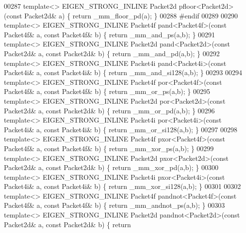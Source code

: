 \begin{DoxyCode}
00287 \textcolor{keyword}{template}<> EIGEN\_STRONG\_INLINE Packet2d pfloor<Packet2d>(\textcolor{keyword}{const} Packet2d& a) \{ \textcolor{keywordflow}{return} \_mm\_floor\_pd(a); \}
00288 \textcolor{preprocessor}{#endif}
00289 
00290 \textcolor{keyword}{template}<> EIGEN\_STRONG\_INLINE Packet4f pand<Packet4f>(\textcolor{keyword}{const} Packet4f& a, \textcolor{keyword}{const} Packet4f& b) \{ \textcolor{keywordflow}{return} 
      \_mm\_and\_ps(a,b); \}
00291 \textcolor{keyword}{template}<> EIGEN\_STRONG\_INLINE Packet2d pand<Packet2d>(\textcolor{keyword}{const} Packet2d& a, \textcolor{keyword}{const} Packet2d& b) \{ \textcolor{keywordflow}{return} 
      \_mm\_and\_pd(a,b); \}
00292 \textcolor{keyword}{template}<> EIGEN\_STRONG\_INLINE Packet4i pand<Packet4i>(\textcolor{keyword}{const} Packet4i& a, \textcolor{keyword}{const} Packet4i& b) \{ \textcolor{keywordflow}{return} 
      \_mm\_and\_si128(a,b); \}
00293 
00294 \textcolor{keyword}{template}<> EIGEN\_STRONG\_INLINE Packet4f por<Packet4f>(\textcolor{keyword}{const} Packet4f& a, \textcolor{keyword}{const} Packet4f& b) \{ \textcolor{keywordflow}{return} 
      \_mm\_or\_ps(a,b); \}
00295 \textcolor{keyword}{template}<> EIGEN\_STRONG\_INLINE Packet2d por<Packet2d>(\textcolor{keyword}{const} Packet2d& a, \textcolor{keyword}{const} Packet2d& b) \{ \textcolor{keywordflow}{return} 
      \_mm\_or\_pd(a,b); \}
00296 \textcolor{keyword}{template}<> EIGEN\_STRONG\_INLINE Packet4i por<Packet4i>(\textcolor{keyword}{const} Packet4i& a, \textcolor{keyword}{const} Packet4i& b) \{ \textcolor{keywordflow}{return} 
      \_mm\_or\_si128(a,b); \}
00297 
00298 \textcolor{keyword}{template}<> EIGEN\_STRONG\_INLINE Packet4f pxor<Packet4f>(\textcolor{keyword}{const} Packet4f& a, \textcolor{keyword}{const} Packet4f& b) \{ \textcolor{keywordflow}{return} 
      \_mm\_xor\_ps(a,b); \}
00299 \textcolor{keyword}{template}<> EIGEN\_STRONG\_INLINE Packet2d pxor<Packet2d>(\textcolor{keyword}{const} Packet2d& a, \textcolor{keyword}{const} Packet2d& b) \{ \textcolor{keywordflow}{return} 
      \_mm\_xor\_pd(a,b); \}
00300 \textcolor{keyword}{template}<> EIGEN\_STRONG\_INLINE Packet4i pxor<Packet4i>(\textcolor{keyword}{const} Packet4i& a, \textcolor{keyword}{const} Packet4i& b) \{ \textcolor{keywordflow}{return} 
      \_mm\_xor\_si128(a,b); \}
00301 
00302 \textcolor{keyword}{template}<> EIGEN\_STRONG\_INLINE Packet4f pandnot<Packet4f>(\textcolor{keyword}{const} Packet4f& a, \textcolor{keyword}{const} Packet4f& b) \{ \textcolor{keywordflow}{return} 
      \_mm\_andnot\_ps(a,b); \}
00303 \textcolor{keyword}{template}<> EIGEN\_STRONG\_INLINE Packet2d pandnot<Packet2d>(\textcolor{keyword}{const} Packet2d& a, \textcolor{keyword}{const} Packet2d& b) \{ \textcolor{keywordflow}{return} 

\end{DoxyCode}
